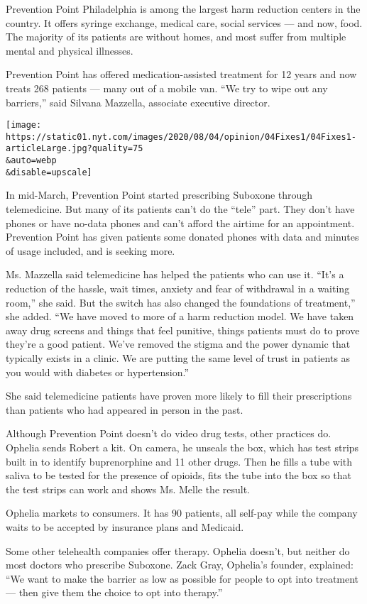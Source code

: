 Prevention Point Philadelphia is among the largest harm reduction
centers in the country. It offers syringe exchange, medical care, social
services --- and now, food. The majority of its patients are without
homes, and most suffer from multiple mental and physical illnesses.

Prevention Point has offered medication-assisted treatment for 12 years
and now treats 268 patients --- many out of a mobile van. ``We try to
wipe out any barriers,'' said Silvana Mazzella, associate executive
director.

\texttt{[image: https://static01.nyt.com/images/2020/08/04/opinion/04Fixes1/04Fixes1-articleLarge.jpg?quality=75\\\&auto=webp\\\&disable=upscale]}

In mid-March, Prevention Point started prescribing Suboxone through
telemedicine. But many of its patients can't do the ``tele'' part. They
don't have phones or have no-data phones and can't afford the airtime
for an appointment. Prevention Point has given patients some donated
phones with data and minutes of usage included, and is seeking more.

Ms. Mazzella said telemedicine has helped the patients who can use it.
``It's a reduction of the hassle, wait times, anxiety and fear of
withdrawal in a waiting room,'' she said. But the switch has also
changed the foundations of treatment,'' she added. ``We have moved to
more of a harm reduction model. We have taken away drug screens and
things that feel punitive, things patients must do to prove they're a
good patient. We've removed the stigma and the power dynamic that
typically exists in a clinic. We are putting the same level of trust in
patients as you would with diabetes or hypertension.''

She said telemedicine patients have proven more likely to fill their
prescriptions than patients who had appeared in person in the past.

Although Prevention Point doesn't do video drug tests, other practices
do. Ophelia sends Robert a kit. On camera, he unseals the box, which has
test strips built in to identify buprenorphine and 11 other drugs. Then
he fills a tube with saliva to be tested for the presence of opioids,
fits the tube into the box so that the test strips can work and shows
Ms. Melle the result.

Ophelia markets to consumers. It has 90 patients, all self-pay while the
company waits to be accepted by insurance plans and Medicaid.

Some other telehealth companies offer therapy. Ophelia doesn't, but
neither do most doctors who prescribe Suboxone. Zack Gray, Ophelia's
founder, explained: ``We want to make the barrier as low as possible for
people to opt into treatment --- then give them the choice to opt into
therapy.''

